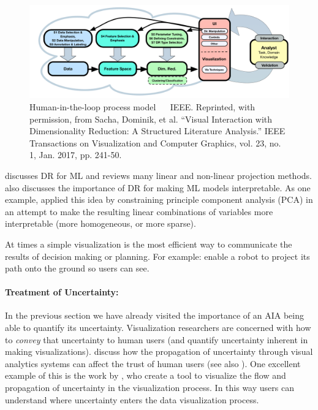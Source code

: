 \begin{figure}[htpb]
    \centering
    \includegraphics[width=0.8\linewidth]{Figures/dimred_framework.png}
    \caption{Human-in-the-loop process model ~\cite{Sacha2017-hf}~ IEEE. Reprinted, with permission, from Sacha, Dominik, et al. ``Visual Interaction with Dimensionality Reduction: A Structured Literature Analysis.'' IEEE Transactions on Visualization and Computer Graphics, vol. 23, no. 1, Jan. 2017, pp. 241-50.}
    \label{fig:sacha_fig}
\end{figure}

\citet{Venna2007-yj} discusses DR for ML and reviews many linear and non-linear projection methods. \citet{Vellido2012-nm} also discusses the importance of DR for making ML models interpretable. As one example, \citet{Chipman2005-om} applied this idea by constraining principle component analysis (PCA) in an attempt to make the resulting linear combinations of variables more interpretable (more homogeneous, or more sparse).

At times a simple visualization is the most efficient way to communicate the results of decision making or planning. For example: \citet{Chadalavada2015-wx} enable a robot to project its path onto the ground so users can see.

\paragraph{Treatment of Uncertainty:}
In the previous section we have already visited the importance of an AIA being able to quantify its uncertainty. Visualization researchers are concerned with how to \emph{convey} that uncertainty to human users (and quantify uncertainty inherent in making visualizations). \citet{Sacha2016-tu} discuss how the propagation of uncertainty through visual analytics systems can affect the trust of human users (see also \cite{Correa2009-hi}).
One excellent example of this is the work by \citet{Wu2012-qi}, who create a tool to visualize the flow and propagation of uncertainty in the visualization process. In this way users can understand where uncertainty enters the data visualization process.

